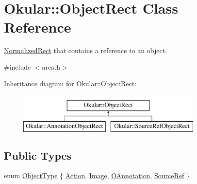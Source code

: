 \hypertarget{classOkular_1_1ObjectRect}{\section{Okular\+:\+:Object\+Rect Class Reference}
\label{classOkular_1_1ObjectRect}
}


\hyperlink{classOkular_1_1NormalizedRect}{Normalized\+Rect} that contains a reference to an object.  




{\ttfamily \#include $<$area.\+h$>$}

Inheritance diagram for Okular\+:\+:Object\+Rect\+:\begin{figure}[H]
\begin{center}
\leavevmode
\includegraphics[height=2.000000cm]{classOkular_1_1ObjectRect}
\end{center}
\end{figure}
\subsection*{Public Types}
\begin{DoxyCompactItemize}
\item 
enum \hyperlink{classOkular_1_1ObjectRect_a2f77f7653306bae90bfb68277aaafe16}{Object\+Type} \{ \hyperlink{classOkular_1_1ObjectRect_a2f77f7653306bae90bfb68277aaafe16a2ad02138861dfdc8bc2a0c29bae5bed2}{Action}, 
\hyperlink{classOkular_1_1ObjectRect_a2f77f7653306bae90bfb68277aaafe16a1384fe70201a84f6c3554a7ca6fc84d2}{Image}, 
\hyperlink{classOkular_1_1ObjectRect_a2f77f7653306bae90bfb68277aaafe16a7fa3680e4804e223e58ce2dea398345f}{O\+Annotation}, 
\hyperlink{classOkular_1_1ObjectRect_a2f77f7653306bae90bfb68277aaafe16abd7dcb9a8d9df2544c535d1a22155f83}{Source\+Ref}
 \}
\end{DoxyCompactItemize}
